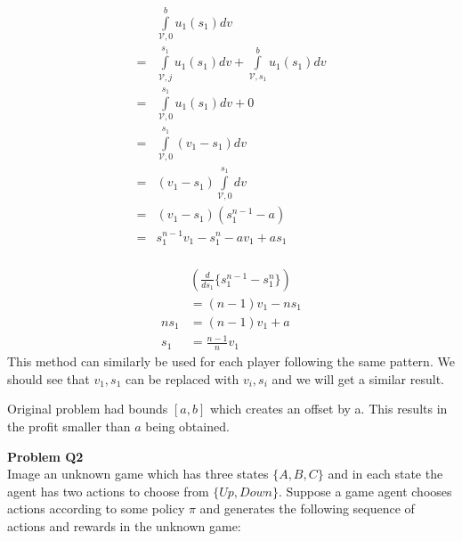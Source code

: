 \documentclass[12pt,letter]{article}
\newcommand{\problem}[1]{\vspace{3mm}\Large\textbf{{Problem {#1}\vspace{3mm}}}\normalsize\\}
\begin{document}
\begin{minipage}{\textwidth}
\begin{multicols}{2}
\begin{align*}
    &\int\limits_{\mathcal{V},0}^b u_1(s_1) dv\\
    =&\int\limits_{\mathcal{V},j}^{s_1} u_1(s_1)dv + \int\limits_{\mathcal{V},s_1}^b u_1(s_1)dv\\
    =&\int\limits_{\mathcal{V},0}^{s_1} u_1(s_1)dv + 0\\
    =&\int\limits_{\mathcal{V},0}^{s_1} (v_1 - s_1)dv\\
    =&(v_1 - s_1) \int\limits_{\mathcal{V},0}^{s_1}dv\\
    =&(v_1 - s_1)(s_1^{n-1} - a)\\
    =&s_1^{n-1}v_1 - s_1^{n} -av_1 + as_1\\
\end{align*}

\begin{align*}
    &\left(\frac{d}{ds_1}\{s_1^{n-1}-s_1^{n}\}\right)\\
    &= (n-1)v_1 - ns_1\\
    ns_1 &= (n-1)v_1 +a \\
    s_1 &= \frac{n-1}{n}v_1
\end{align*}
This method can similarly be used for each player following the same pattern.
We should see that $v_1,s_1$ can be replaced with $v_i,s_i$ and we will get
a similar result.

Original problem had bounds $[a,b]$ which creates an offset by a. This results
in the profit smaller than $a$ being obtained. 
\end{multicols}
\end{minipage}


\problem{Q2}
Image an unknown game which has three states $\{A,B,C\}$ and in each state the
agent has two actions to choose from $\{Up,Down\}$. Suppose a game agent chooses
actions according to some policy $\pi$ and generates the following sequence of
actions and rewards in the unknown game:
\end{document}
